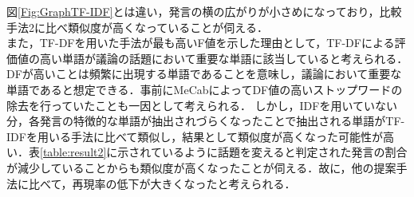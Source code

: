 図\ref{Fig:GraphTF-IDF}とは違い，発言の横の広がりが小さめになっており，比較手法2に比べ類似度が高くなっていることが伺える．
\\
また，TF-DFを用いた手法が最も高いF値を示した理由として，TF-DFによる評価値の高い単語が議論の話題において重要な単語に該当していると考えられる．DFが高いことは頻繁に出現する単語であることを意味し，議論において重要な単語であると想定できる．事前にMeCabによってDF値の高いストップワードの除去を行っていたことも一因として考えられる．
しかし，IDFを用いていない分，各発言の特徴的な単語が抽出されづらくなったことで抽出される単語がTF-IDFを用いる手法に比べて類似し，結果として類似度が高くなった可能性が高い．表\ref{table:result2}に示されているように話題を変えると判定された発言の割合が減少していることからも類似度が高くなったことが伺える．故に，他の提案手法に比べて，再現率の低下が大きくなったと考えられる．

